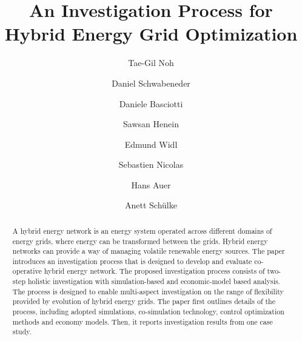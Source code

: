 \documentclass[review]{elsarticle}
\begin{document}
\newcommand{\todo}[1]{\textbf{TODO: #1}\\}

\begin{frontmatter}


\title{An Investigation Process for Hybrid Energy Grid Optimization}


\author[NLE]{Tae-Gil Noh}

\author[TUWien]{Daniel Schwabeneder}

\author[AIT]{Daniele Basciotti}

\author[AIT]{Sawsan Henein}

\author[AIT]{Edmund Widl}

\author[NLE]{Sebastien Nicolas}

\author[TUWien]{Hans Auer}

\author[NLE]{Anett Sch\"ulke}

\address[NLE]{NEC Laboratories Europe, Kurfuersten-Anlage 36, 69115,
  Heidelberg, Germany}
\address[TUWien]{(address of EEG), TU Wien, Vienna, Austria}
\address[AIT]{(address of AIT), Vienna, Austria} 


\begin{abstract}
A hybrid energy network is an energy system operated across different
domains of energy grids, where energy can be transformed between the
grids. Hybrid energy networks can provide a way of managing volatile 
renewable energy sources. The paper introduces an investigation
process that is designed to develop and evaluate co-operative hybrid
energy network. The proposed investigation process consists of
two-step holistic investigation with simulation-based and
economic-model based analysis. The process is designed to enable
multi-aspect investigation on the range of flexibility provided by
evolution of hybrid energy grids. The paper first outlines details of
the process, including adopted simulations, co-simulation technology,
control optimization methods and economy models. Then, it reports
investigation results from one case study. 
\end{abstract}


\end{frontmatter}
\end{document}
